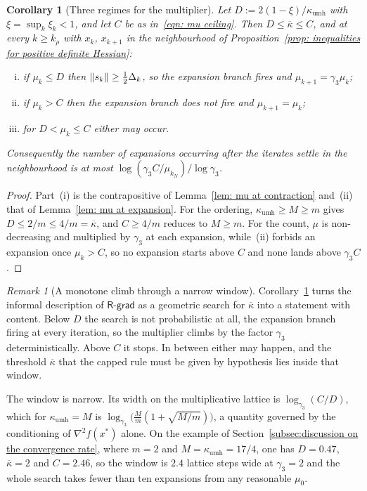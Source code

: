 \documentclass[11pt]{article}
\theoremstyle{plain}
\newtheorem{corollary}[theorem]{Corollary}
\theoremstyle{definition}
\theoremstyle{remark}
\newtheorem{remark}[theorem]{Remark}
\numberwithin{equation}{section}
\providecommand{\defeq}{\mathrel{:=}}
\newcommand*\mykappa[1]{\kappa_{\scriptscriptstyle\text{#1}}}
\newcommand{\Rgrad}{\textsf{R-grad}}
\providecommand{\gthree}{\gamma_3}
\providecommand{\kbar}{\overline{\kappa}}
\providecommand{\kbar}{\overline{\kappa}}
\begin{document}
\begin{corollary}[Three regimes for the multiplier]
\label{cor: mu three regimes}
    Let $D \defeq 2(1-\xi)/\mykappa{umh}$ with $\xi = \sup_k\xi_k < 1$, and let $C$ be as
    in~\eqref{eqn: mu ceiling}. Then $D \leq \kbar \leq C$, and at every $k \geq k_\rho$ with
    $x_k$, $x_{k+1}$ in the neighbourhood of
    Proposition~\ref{prop: inequalities for positive definite Hessian}:
    \begin{enumerate}[(i)]
        \item if $\mu_k \leq D$ then $\left \lVert s_k \right \rVert \geq \tfrac12\Delta_k$, so the expansion branch
              fires and $\mu_{k+1} = \gthree\mu_k$;
        \item if $\mu_k > C$ then the expansion branch does not fire and $\mu_{k+1} = \mu_k$;
        \item for $D < \mu_k \leq C$ either may occur.
    \end{enumerate}
    Consequently the number of expansions occurring after the iterates settle in the neighbourhood
    is at most $\log(\gthree C/\mu_{k_N})/\log\gthree$.
\end{corollary}

\begin{proof}
    Part~(i) is the contrapositive of Lemma~\ref{lem: mu at contraction} and~(ii) that of
    Lemma~\ref{lem: mu at expansion}. For the ordering, $\mykappa{umh} \geq M \geq m$ gives
    $D \leq 2/m \leq 4/m = \kbar$, and $C \geq 4/m$ reduces to $M \geq m$. For the count, $\mu$
    is non-decreasing and multiplied by $\gthree$ at each expansion, while~(ii) forbids an
    expansion once $\mu_k > C$, so no expansion starts above $C$ and none lands above $\gthree C$.
\end{proof}

\begin{remark}[A monotone climb through a narrow window]
\label{rem: mu window}
    Corollary~\ref{cor: mu three regimes} turns the informal description of $\Rgrad$ as a
    geometric search for $\kbar$ into a statement with content. Below $D$ the search is not
    probabilistic at all, the expansion branch firing at every iteration, so the multiplier climbs
    by the factor $\gthree$ deterministically. Above $C$ it stops. In between either may happen,
    and the threshold $\kbar$ that the capped rule must be given by hypothesis lies inside that
    window.

    The window is narrow. Its width on the multiplicative lattice is
    $\log_{\gthree}(C/D)$, which for $\mykappa{umh} = M$ is
    $\log_{\gthree}\bigl(\tfrac{M}{m}(1+\sqrt{M/m})\bigr)$, a quantity governed by the
    conditioning of $\nabla^2 f(x^*)$ alone. On the example of
    Section~\ref{subsec:discussion on the convergence rate}, where $m = 2$ and
    $M = \mykappa{umh} = 17/4$, one has $D = 0.47$, $\kbar = 2$ and $C = 2.46$, so the window is
    $2.4$ lattice steps wide at $\gthree = 2$ and the whole search takes fewer than ten
    expansions from any reasonable $\mu_0$.
\end{remark}
\end{document}
